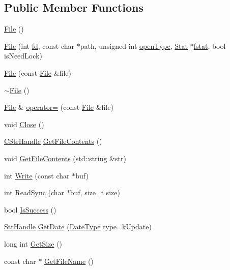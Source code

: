 \subsection*{Public Member Functions}
\begin{DoxyCompactItemize}
\item 
\hyperlink{classmocha_1_1_file_ae039af5807fc385f41b60644725d15d0}{File} ()
\item 
\hyperlink{classmocha_1_1_file_abd7ef89b6d9000d2ff75ef78965c5ab6}{File} (int \hyperlink{classmocha_1_1_file_ac34e63054b7ff96513b163692909bc06}{fd}, const char $\ast$path, unsigned int \hyperlink{classmocha_1_1_file_aedc322e34cdfe5248644cf425b165ae7}{openType}, \hyperlink{classmocha_1_1_stat}{Stat} $\ast$\hyperlink{classmocha_1_1_file_a1af3675df21335d14aefa9d775c808e2}{fstat}, bool isNeedLock)
\item 
\hyperlink{classmocha_1_1_file_a59bf1e7bb0c6b8dd83dccef6b942a0f9}{File} (const \hyperlink{classmocha_1_1_file}{File} \&file)
\item 
\hyperlink{classmocha_1_1_file_ac704ebdf5f57d7a1c5ddf409d797fb69}{$\sim$File} ()
\item 
\hyperlink{classmocha_1_1_file}{File} \& \hyperlink{classmocha_1_1_file_a8160d4f295558728cc217d4740cbd01e}{operator=} (const \hyperlink{classmocha_1_1_file}{File} \&file)
\item 
void \hyperlink{classmocha_1_1_file_a7ce241fcabbbbed256d1d2beb5de300f}{Close} ()
\item 
\hyperlink{classmocha_1_1_allocator_handle}{CStrHandle} \hyperlink{classmocha_1_1_file_a38e9611c580c29cef7d992e9093847ee}{GetFileContents} ()
\item 
void \hyperlink{classmocha_1_1_file_a544e01571f2abe1a85535af34bff010e}{GetFileContents} (std::string \&str)
\item 
int \hyperlink{classmocha_1_1_file_afe41d2812a4c6c47f8f90c3a3a7b8b38}{Write} (const char $\ast$buf)
\item 
int \hyperlink{classmocha_1_1_file_ad399ddacdbe03508f436d212a0068b2e}{ReadSync} (char $\ast$buf, size\_\-t size)
\item 
bool \hyperlink{classmocha_1_1_file_af32f10e682a473e2d1f26b223f84092a}{IsSuccess} ()
\item 
\hyperlink{classmocha_1_1_array_handle}{StrHandle} \hyperlink{classmocha_1_1_file_a90999c2a1d0bf842f46daed77d9e20a7}{GetDate} (\hyperlink{classmocha_1_1_file_a86110d8e8c2dfa58f84ae6617aa1fb6a}{DateType} type=kUpdate)
\item 
long int \hyperlink{classmocha_1_1_file_a4a951d40672719f17aa9d779f51b37ba}{GetSize} ()
\item 
const char $\ast$ \hyperlink{classmocha_1_1_file_a824c8f6dfaec9e9b7639973995edf7f5}{GetFileName} ()
\end{DoxyCompactItemize}
